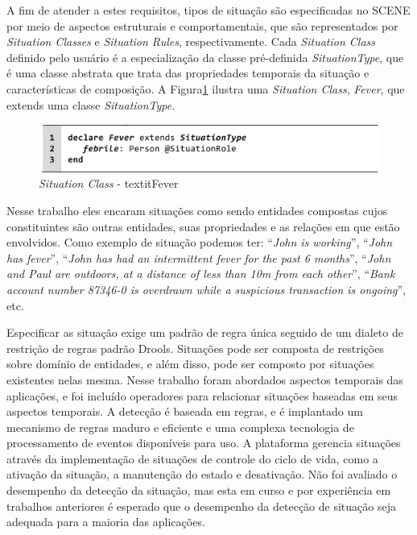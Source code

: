\documentclass[12pt,a4paper,compsoc]{IEEEtran}
\begin{document}
  A fim de atender a estes requisitos, tipos de situação são especificadas no SCENE por meio de 
  aspectos estruturais e comportamentais, que são representados por  \textit{Situation Classes} e
  \textit{Situation Rules}, respectivamente. Cada \textit{Situation Class} definido pelo usuário é
  a especialização da classe pré-definida \textit{SituationType}, que é uma classe abstrata que
  trata das propriedades temporais da situação e características de composição.
  A Figura\ref{situation-classe-fever} ilustra uma \textit{Situation Class}, \textit{Fever}, que
  extends uma classe \textit{SituationType}.
  
  \begin{figure}[ht]
  \centerline{\includegraphics[scale=.25]{imagens/situation-classe-fever.png}}
  \caption{\textit{Situation Class} - textit{Fever} \cite{pereira2013rule}}
  \label{situation-classe-fever}
  \end{figure}

  Nesse trabalho eles encaram situações como sendo entidades compostas cujos constituintes são
  outras entidades, suas propriedades e as relações em que estão envolvidos. Como exemplo de
  situação podemos ter: ``\textit{John is working}'', ``\textit{John has fever}'', 
  ``\textit{John has had an intermittent fever for the past 6 months}'', 
  ``\textit{John and Paul are outdoors, at a distance of less than 10m from each other}'',
  ``\textit{Bank account number 87346-0 is overdrawn while a suspicious transaction is ongoing}'',
  etc.

  Especificar as situação exige um padrão de regra única seguido de um dialeto de restrição de
  regras padrão Drools. Situações pode ser composta de restrições sobre domínio de entidades, e
  além disso, pode ser composto por situações existentes nelas mesma. Nesse trabalho foram
  abordados aspectos temporais das aplicações, e foi incluído operadores para relacionar situações
  baseadas em seus aspectos temporais. A detecção é baseada em regras, e é implantado um mecanismo
  de regras maduro e eficiente e uma complexa tecnologia de processamento de eventos disponíveis
  para uso. A plataforma gerencia situações através da implementação de situações de controle do
  ciclo de vida, como a ativação da situação, a manutenção do estado e desativação. Não foi
  avaliado o desempenho da detecção da situação, mas esta em curso e por experiência em trabalhos
  anteriores é esperado que o desempenho da detecção de situação seja adequada para a maioria das
  aplicações.
\end{document}
